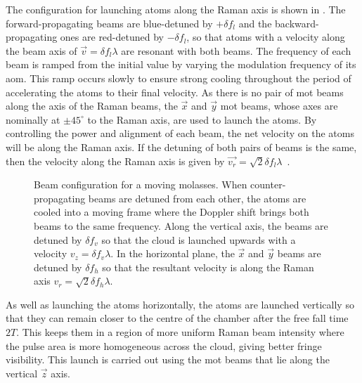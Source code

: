 The configuration for launching atoms along the Raman axis is shown in
. The forward-propagating beams are
blue-detuned by \(+\delta f_l\) and the backward-propagating ones are
red-detuned by \(-\delta f_l\), so that atoms with a velocity along the
beam axis of \(\vec{v} = \delta f_l \lambda\) are resonant with both
beams. The frequency of each beam is ramped from the initial value by
varying the modulation frequency of its \ac{aom}. This ramp occurs
slowly to ensure strong cooling throughout the period of accelerating
the atoms to their final velocity. As there is
no pair of \ac{mot} beams along the axis of the Raman beams, the
\(\vec{x}\) and \(\vec{y}\) \ac{mot} beams, whose axes are nominally
at $\pm45^{\circ}$ to the Raman axis, are used to launch the atoms. By
controlling the power and alignment of each beam, the net velocity on
the atoms will be along the Raman axis. If the detuning of both pairs
of beams is the same, then the velocity along the Raman axis is given
by \(\vec{v_r} = \sqrt{2} \delta f_l \lambda\)~\cite{Ohshima1995}.
\begin{figure}[!htbp]
  \centering
  \def\svgwidth{0.6\textwidth}
  \caption[Beam configuration for a moving molasses]{Beam
    configuration for a moving molasses. When counter-propagating
    beams are detuned from each other, the atoms are cooled into a
    moving frame where the Doppler shift brings both beams to the same
    frequency. Along the vertical
    axis, the beams are detuned by \(\delta f_v\) so that the cloud is
    launched upwards with a velocity \(v_z = \delta f_v \lambda\). In the
    horizontal plane, the \(\vec{x}\) and \(\vec{y}\) beams are detuned by
    \(\delta f_h\) so that the resultant velocity is along the Raman axis
  \(v_r = \sqrt{2}\delta f_h\lambda\). }
  \label{fig:moving_molasses}
\end{figure}
\par\noindent
As well as launching the atoms horizontally, the atoms are launched
vertically so that they can remain closer to the centre of the chamber
after the free fall time $2T$. This keeps them in a region of more
uniform Raman beam intensity where the pulse area is more homogeneous
across the cloud, giving better fringe visibility. This launch is carried out using the \ac{mot} beams that lie along the
vertical \(\vec{z}\) axis. 
\par\noindent
